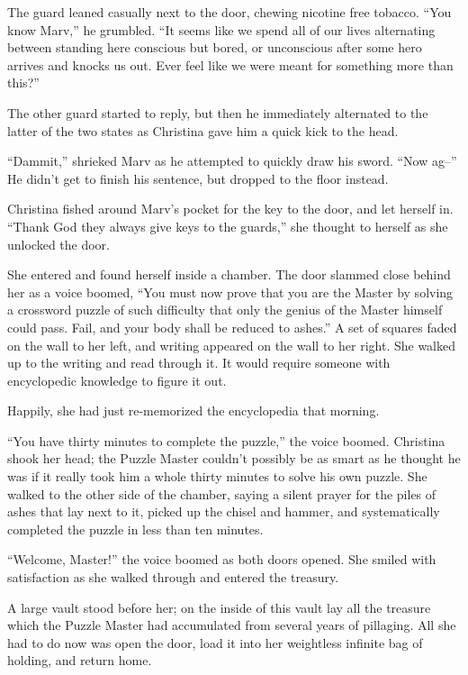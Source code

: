 
The guard leaned casually next to the door, chewing nicotine free tobacco.  “You know Marv,” he grumbled.  “It seems like we spend all of our lives alternating between standing here conscious but bored, or unconscious after some hero arrives and knocks us out.  Ever feel like we were meant for something more than this?”

The other guard started to reply, but then he immediately alternated to the latter of the two states as Christina gave him a quick kick to the head.

“Dammit,” shrieked Marv as he attempted to quickly draw his sword.  “Now ag--”  He didn’t get to finish his sentence, but dropped to the floor instead.

Christina fished around Marv’s pocket for the key to the door, and let herself in.  “Thank God they always give keys to the guards,” she thought to herself as she unlocked the door.

She entered and found herself inside a chamber.  The door slammed close behind her as a voice boomed, “You must now prove that you are the Master by solving a crossword puzzle of such difficulty that only the genius of the Master himself could pass.  Fail, and your body shall be reduced to ashes.”  A set of squares faded on the wall to her left, and writing appeared on the wall to her right.  She walked up to the writing and read through it.  It would require someone with encyclopedic knowledge to figure it out.

Happily, she had just re-memorized the encyclopedia that morning.

“You have thirty minutes to complete the puzzle,” the voice boomed.  Christina shook her head;  the Puzzle Master couldn’t possibly be as smart as he thought he was if it really took him a whole thirty minutes to solve his own puzzle.  She walked to the other side of the chamber, saying a silent prayer for the piles of ashes that lay next to it, picked up the chisel and hammer, and systematically completed the puzzle in less than ten minutes.

“Welcome, Master!”  the voice boomed as both doors opened.  She smiled with satisfaction as she walked through and entered the treasury.

A large vault stood before her;  on the inside of this vault lay all the treasure which the Puzzle Master had accumulated from several years of pillaging.  All she had to do now was open the door, load it into her weightless infinite bag of holding, and return home.

